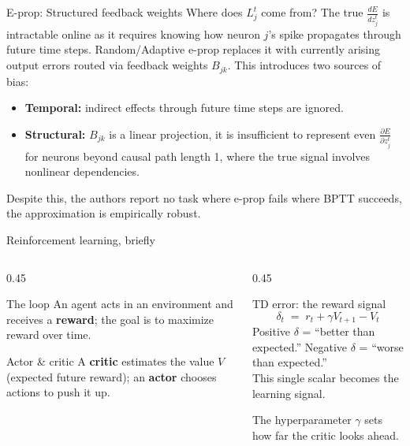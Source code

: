 \documentclass[aspectratio=169,11pt]{beamer}
\begin{document}
\begin{frame}{E-prop: Structured feedback weights}
  Where does $L_j^t$ come from? The true $\frac{dE}{dz_j^t}$
  is intractable online as it requires knowing how neuron $j$'s spike
  propagates through future time steps. Random/Adaptive e-prop replaces it with
  currently arising output errors routed via feedback weights $B_{jk}$.
  \vfill
  This introduces two sources of bias:
  \begin{itemize}
    \item \textbf{Temporal:} indirect effects through future time steps
          are ignored.
    \item \textbf{Structural:} $B_{jk}$ is a linear projection, it is
          insufficient to represent even $\frac{\partial E}{\partial z_j^t}$
          for neurons beyond causal path length 1, where the true signal
          involves nonlinear dependencies.
  \end{itemize}
  \vfill
  Despite this, the authors report no task where e-prop fails where
  BPTT succeeds, the approximation is empirically robust.
  \vfill

\end{frame}

\begin{frame}{Reinforcement learning, briefly}
  \begin{columns}[T]
    \begin{column}{0.45\textwidth}
      \begin{block}{The loop}
        An agent acts in an environment and receives a \textbf{reward};
        the goal is to maximize reward over time.
      \end{block}
      \begin{block}{Actor \& critic}
        A \textbf{critic} estimates the value $V$ (expected future reward);
        an \textbf{actor} chooses actions to push it up.
      \end{block}
    \end{column}
    \begin{column}{0.45\textwidth}
      \begin{alertblock}{TD error: the reward signal}
        \[
          \delta_t \;=\; r_t + \gamma V_{t+1} - V_t
        \]
        Positive $\delta$ = ``better than expected.''
        Negative $\delta$ = ``worse than expected.'' \\
        This single scalar becomes the learning signal.
        
        The hyperparameter $\gamma$ sets how far the critic looks ahead.
      \end{alertblock}
    \end{column}
  \end{columns}
\end{frame}
\end{document}
